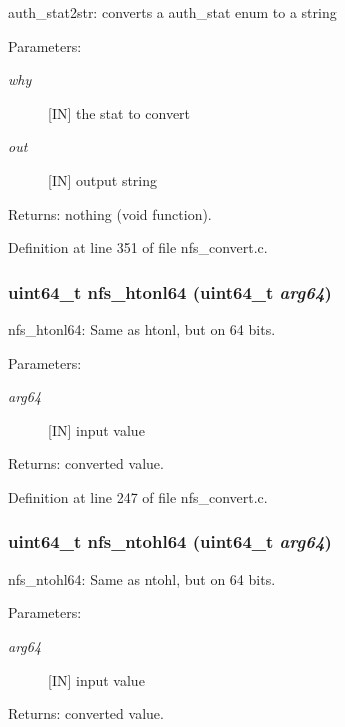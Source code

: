 auth\_\-stat2str: converts a auth\_\-stat enum to a string

\begin{Desc}
\item[Parameters:]
\begin{description}
\item[{\em why}][IN] the stat to convert \item[{\em out}][IN] output string\end{description}
\end{Desc}
\begin{Desc}
\item[Returns:]nothing (void function). \end{Desc}


Definition at line 351 of file nfs\_\-convert.c.
\subsubsection{\setlength{\rightskip}{0pt plus 5cm}uint64\_\-t nfs\_\-htonl64 (uint64\_\-t {\em arg64})}\label{nfs__convert_8c_a4}


nfs\_\-htonl64: Same as htonl, but on 64 bits.

\begin{Desc}
\item[Parameters:]
\begin{description}
\item[{\em arg64}][IN] input value\end{description}
\end{Desc}
\begin{Desc}
\item[Returns:]converted value. \end{Desc}


Definition at line 247 of file nfs\_\-convert.c.
\subsubsection{\setlength{\rightskip}{0pt plus 5cm}uint64\_\-t nfs\_\-ntohl64 (uint64\_\-t {\em arg64})}\label{nfs__convert_8c_a5}


nfs\_\-ntohl64: Same as ntohl, but on 64 bits.

\begin{Desc}
\item[Parameters:]
\begin{description}
\item[{\em arg64}][IN] input value\end{description}
\end{Desc}
\begin{Desc}
\item[Returns:]converted value. \end{Desc}


